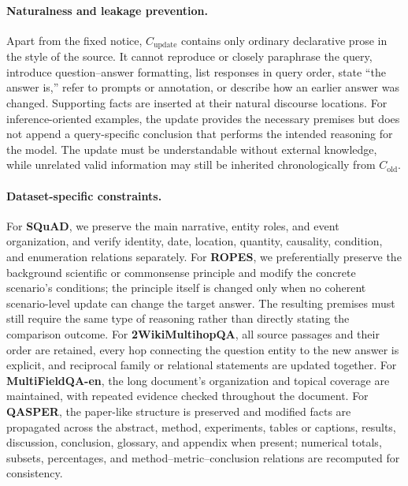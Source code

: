 \paragraph{Naturalness and leakage prevention.}
Apart from the fixed notice, $C_{\mathrm{update}}$ contains only ordinary declarative prose in the style of the source. It cannot reproduce or closely paraphrase the query, introduce question--answer formatting, list responses in query order, state ``the answer is,'' refer to prompts or annotation, or describe how an earlier answer was changed. Supporting facts are inserted at their natural discourse locations. For inference-oriented examples, the update provides the necessary premises but does not append a query-specific conclusion that performs the intended reasoning for the model. The update must be understandable without external knowledge, while unrelated valid information may still be inherited chronologically from $C_{\mathrm{old}}$.

\paragraph{Dataset-specific constraints.}
For \textbf{SQuAD}, we preserve the main narrative, entity roles, and event organization, and verify identity, date, location, quantity, causality, condition, and enumeration relations separately. For \textbf{ROPES}, we preferentially preserve the background scientific or commonsense principle and modify the concrete scenario's conditions; the principle itself is changed only when no coherent scenario-level update can change the target answer. The resulting premises must still require the same type of reasoning rather than directly stating the comparison outcome. For \textbf{2WikiMultihopQA}, all source passages and their order are retained, every hop connecting the question entity to the new answer is explicit, and reciprocal family or relational statements are updated together. For \textbf{MultiFieldQA-en}, the long document's organization and topical coverage are maintained, with repeated evidence checked throughout the document. For \textbf{QASPER}, the paper-like structure is preserved and modified facts are propagated across the abstract, method, experiments, tables or captions, results, discussion, conclusion, glossary, and appendix when present; numerical totals, subsets, percentages, and method--metric--conclusion relations are recomputed for consistency.

